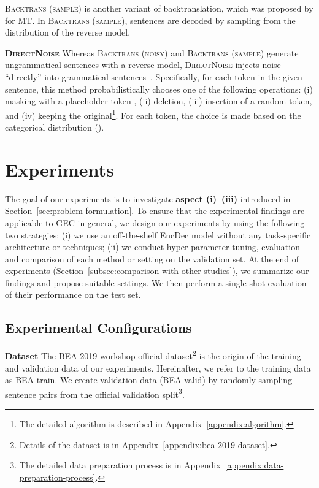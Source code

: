 \documentclass[11pt,a4paper]{article}
\newcommand{\mask}{}
\newcommand{\backtrans}{\textsc{Backtrans (noisy)}}
\newcommand{\samplebacktrans}{\textsc{Backtrans (sample)}}
\newcommand{\directnoise}{\textsc{DirectNoise}}
\begin{document}
\samplebacktrans{} is another variant of backtranslation, which was proposed by \citet{edunov:2018:EMNLP} for MT.
In \samplebacktrans{}, sentences are decoded by sampling from the distribution of the reverse model.

\noindent\textbf{\directnoise{}}\hspace*{3mm} 
Whereas \backtrans{} and \samplebacktrans{} generate ungrammatical sentences with a reverse model, \directnoise{} injects noise ``directly'' into grammatical sentences~\citep{edunov:2018:EMNLP,zhao2019improving}.
Specifically, for each token in the given sentence, this method probabilistically chooses one of the following operations: (i) masking with a placeholder token \mask{}, (ii) deletion, (iii) insertion of a random token, and (iv) keeping the original\footnote{The detailed algorithm is described in Appendix~\ref{appendix:algorithm}.}.
For each token, the choice is made based on the categorical distribution ().

\section{Experiments}
\label{sec:experiment}
The goal of our experiments is to investigate \textbf{aspect (i)--(iii)} introduced in Section~\ref{sec:problem-formulation}.
To ensure that the experimental findings are applicable to GEC in general, we design our experiments by using the following two strategies:
(i) we use an off-the-shelf EncDec model without any task-specific architecture or techniques; (ii) we conduct hyper-parameter tuning, evaluation and comparison of each method or setting on the validation set.
At the end of experiments (Section~\ref{subsec:comparison-with-other-studies}), we summarize our findings and propose suitable settings.
We then perform a single-shot evaluation of their performance on the test set.


\subsection{Experimental Configurations}
\label{subsec:experimental-configurations}
\noindent\textbf{Dataset}\hspace*{3mm}
The BEA-2019 workshop official dataset\footnote{Details of the dataset is in Appendix~\ref{appendix:bea-2019-dataset}.} is the origin of the training and validation data of our experiments.
Hereinafter, we refer to the training data as BEA-train.
We create validation data (BEA-valid) by randomly sampling sentence pairs from the official validation split\footnote{The detailed data preparation process is in Appendix~\ref{appendix:data-preparation-process}.}.
\end{document}
